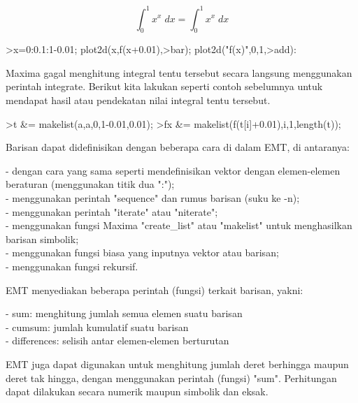\documentclass[a4paper,10pt]{article}
\begin{document}
\begin{eulernotebook}
\begin{eulercomment}
\begin{eulercomment}
\begin{eulercomment}
\begin{eulercomment}
\begin{eulercomment}
\begin{eulercomment}
\begin{eulercomment}
\begin{eulercomment}
\begin{euleroutput}
\end{euleroutput}
\begin{eulerformula}
\[
\int_{0}^{1}{x^{x}\;dx}=\int_{0}^{1}{x^{x}\;dx}
\]
\end{eulerformula}
\begin{eulerprompt}
>x=0:0.1:1-0.01; plot2d(x,f(x+0.01),>bar); plot2d("f(x)",0,1,>add):
\end{eulerprompt}
\begin{eulercomment}
Maxima gagal menghitung integral tentu tersebut secara langsung menggunakan perintah
integrate. Berikut kita lakukan seperti contoh sebelumnya untuk mendapat hasil atau
pendekatan nilai integral tentu tersebut.
\end{eulercomment}
\begin{eulerprompt}
>t &= makelist(a,a,0,1-0.01,0.01);
>fx &= makelist(f(t[i]+0.01),i,1,length(t));
\end{eulerprompt}
\begin{eulercomment}
Barisan dapat didefinisikan dengan beberapa cara di dalam EMT, di
antaranya:

- dengan cara yang sama seperti mendefinisikan vektor dengan
elemen-elemen beraturan (menggunakan titik dua ":");\\
- menggunakan perintah "sequence" dan rumus barisan (suku ke -n);\\
- menggunakan perintah "iterate" atau "niterate";\\
- menggunakan fungsi Maxima "create\_list" atau "makelist" untuk
menghasilkan barisan simbolik;\\
- menggunakan fungsi biasa yang inputnya vektor atau barisan;\\
- menggunakan fungsi rekursif.

EMT menyediakan beberapa perintah (fungsi) terkait barisan, yakni:

- sum: menghitung jumlah semua elemen suatu barisan\\
- cumsum: jumlah kumulatif suatu barisan\\
- differences: selisih antar elemen-elemen berturutan

EMT juga dapat digunakan untuk menghitung jumlah deret berhingga
maupun deret tak hingga, dengan menggunakan perintah (fungsi) "sum".
Perhitungan dapat dilakukan secara numerik maupun simbolik dan eksak.


\end{eulercomment}
\end{eulercomment}
\end{eulercomment}
\end{eulercomment}
\end{eulercomment}
\end{eulercomment}
\end{eulercomment}
\end{eulercomment}
\end{eulercomment}
\end{eulernotebook}
\end{document}
